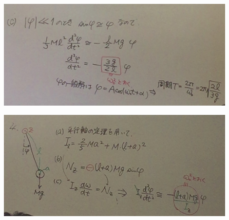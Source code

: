 \documentclass{jsarticle}
\begin{document}
	\begin{center}
		\includegraphics[width=12cm]{5_20_5.JPG}
	\end{center}
	\begin{center}
		\includegraphics[width=12cm]{5_20_6.JPG}
	\end{center}
	
\end{document}
